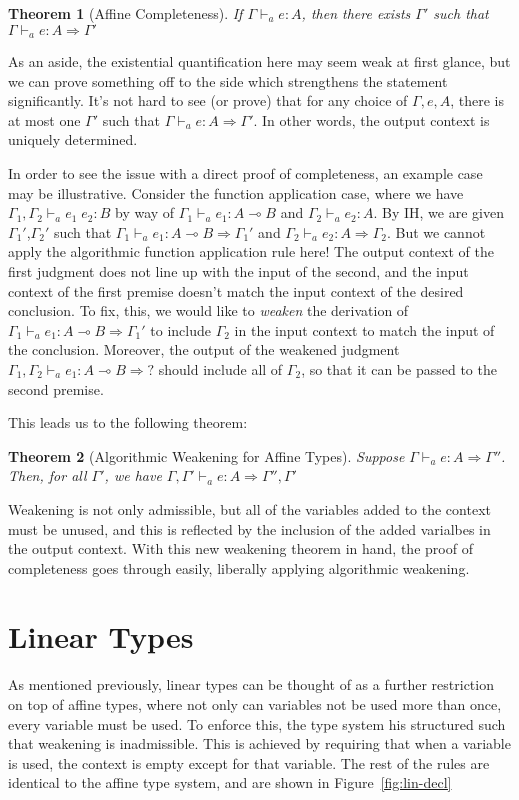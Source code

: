 \documentclass{article}
\newtheorem{theorem}{Theorem}
\theoremstyle{definition}
\newcommand{\loli}{\multimap}
\newcommand{\gens}{\Rightarrow}
\begin{document}
\begin{theorem}[Affine Completeness]
If $\Gamma \vdash_a e : A$, then there exists $\Gamma'$ such that $\Gamma \vdash_a e : A \gens \Gamma'$
\end{theorem}

As an aside, the existential quantification here may seem weak at first glance, but we can prove something off to the side which strengthens the statement significantly. It's not hard to see (or prove) that for any choice of $\Gamma,e,A$, there is at most one $\Gamma'$ such that $\Gamma \vdash_a e : A \gens \Gamma'$. In other words, the output context is uniquely determined.

In order to see the issue with a direct proof of completeness, an example case may be illustrative. Consider the function application case, where we have
$\Gamma_1,\Gamma_2 \vdash_a e_1 \; e_2 : B$ by way of $\Gamma_1 \vdash_a e_1 : A \loli B$ and $\Gamma_2 \vdash_a e_2 : A$. By IH, we are given $\Gamma_1'$,$\Gamma_2'$ such that
$\Gamma_1 \vdash_a e_1 : A \loli B \gens \Gamma_1'$ and $\Gamma_2 \vdash_a e_2 : A \gens \Gamma_2$. But we cannot apply the algorithmic function application rule here! The output context of the first judgment does not line up with the input of the second, and the input context of the first premise doesn't match the input context of the desired conclusion. To fix, this, we would like to \textit{weaken} the derivation of $\Gamma_1 \vdash_a e_1 : A \loli B \gens \Gamma_1'$ to include $\Gamma_2$ in the input context to match the input of the conclusion. Moreover, the output of the weakened judgment $\Gamma_1,\Gamma_2 \vdash_a e_1 : A \loli B \gens ?$ should include all of $\Gamma_2$, so that it can be passed to the second premise.

This leads us to the following theorem:
\begin{theorem}[Algorithmic Weakening for Affine Types]
Suppose $\Gamma \vdash_a e : A \gens \Gamma''$. Then, for all $\Gamma'$, we have $\Gamma,\Gamma' \vdash_a e : A \gens \Gamma'', \Gamma'$
\end{theorem}

Weakening is not only admissible, but all of the variables added to the context must be unused, and this is reflected by the inclusion of the added varialbes in the output context. With this new weakening theorem in hand, the proof of completeness goes through easily, liberally applying  algorithmic weakening.

\section{Linear Types}
As mentioned previously, linear types can be thought of as a further restriction on top of affine types, where not only can variables not be used more than once, every variable must be used. To enforce this, the type system his structured such that weakening is inadmissible. This is achieved by requiring that when a variable is used, the context is empty except for that variable. The rest of the rules are identical to the affine type system, and are shown in Figure~\ref{fig:lin-decl}
\end{document}
